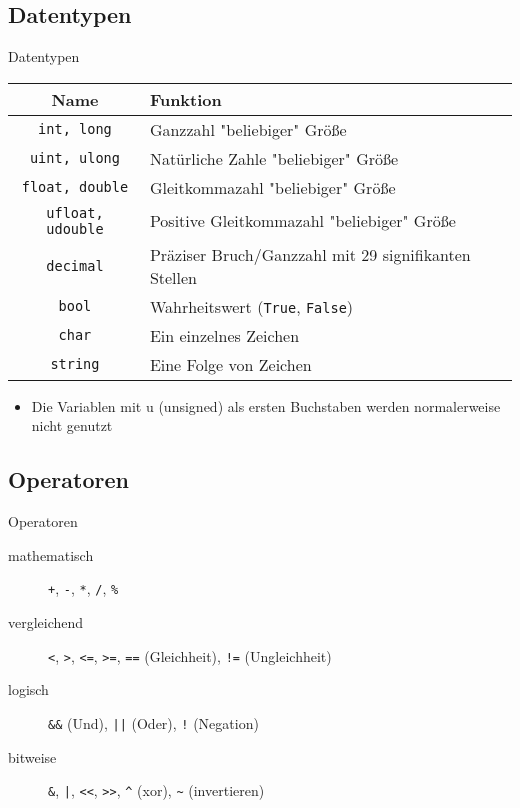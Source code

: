 \subsection{Datentypen}
\begin{frame}{Datentypen}
	\begin{tabular}{c|l}
		Name & Funktion \\ \hline
		\texttt{int, long} & Ganzzahl "beliebiger" Größe \\
		\texttt{uint, ulong} & Natürliche Zahle "beliebiger" Größe \\
		\texttt{float, double} & Gleitkommazahl "beliebiger" Größe \\
		\texttt{ufloat, udouble} & Positive Gleitkommazahl "beliebiger" Größe \\
        \texttt{decimal} & Präziser Bruch/Ganzzahl mit 29 signifikanten Stellen \\
		\texttt{bool} & Wahrheitswert (\texttt{True}, \texttt{False})\\
        \texttt{char} & Ein einzelnes Zeichen \\
		\texttt{string} & Eine Folge von Zeichen \\
	\end{tabular}
	\begin{itemize}
		 \item Die Variablen mit u (unsigned) als ersten Buchstaben werden normalerweise nicht genutzt
	\end{itemize}
\end{frame}

\subsection{Operatoren}
\begin{frame}{Operatoren}
	\begin{description}
	    \item[mathematisch] \alert{\texttt{+}}, \alert{\texttt{-}}, \alert{\texttt{*}}, \alert{\texttt{/}}, \alert{\texttt{\%}}
	    \item[vergleichend] \alert{\texttt{<}}, \alert{\texttt{>}}, \alert{\texttt{<=}}, \alert{\texttt{>=}}, \alert{\texttt{==}} (Gleichheit), \alert{\texttt{!=}} (Ungleichheit)
	    \item[logisch] \alert{\texttt{\&\&}} (Und), \alert{\texttt{||}} (Oder), \alert{\texttt{!}} (Negation)
	    \item[bitweise] \alert{\texttt{\&}}, \alert{\texttt{|}}, \alert{\texttt{<<}}, \alert{\texttt{>>}}, \alert{\texttt{\^}} (xor), \alert{\texttt{\~}} (invertieren)
	\end{description}
\end{frame}


